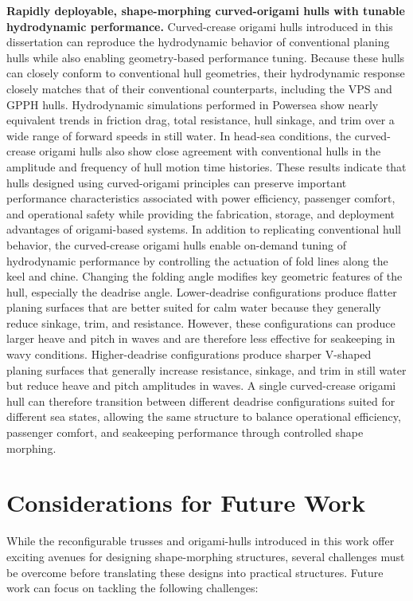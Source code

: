 \noindent{}\textbf{Rapidly deployable, shape-morphing curved-origami hulls with tunable hydrodynamic performance.} Curved-crease origami hulls introduced in this dissertation can reproduce the hydrodynamic behavior of conventional planing hulls while also enabling geometry-based performance tuning. Because these hulls can closely conform to conventional hull geometries, their hydrodynamic response closely matches that of their conventional counterparts, including the VPS and GPPH hulls. Hydrodynamic simulations performed in Powersea show nearly equivalent trends in friction drag, total resistance, hull sinkage, and trim over a wide range of forward speeds in still water. In head-sea conditions, the curved-crease origami hulls also show close agreement with conventional hulls in the amplitude and frequency of hull motion time histories. These results indicate that hulls designed using curved-origami principles can preserve important performance characteristics associated with power efficiency, passenger comfort, and operational safety while providing the fabrication, storage, and deployment advantages of origami-based systems. In addition to replicating conventional hull behavior, the curved-crease origami hulls enable on-demand tuning of hydrodynamic performance by controlling the actuation of fold lines along the keel and chine. Changing the folding angle modifies key geometric features of the hull, especially the deadrise angle. Lower-deadrise configurations produce flatter planing surfaces that are better suited for calm water because they generally reduce sinkage, trim, and resistance. However, these configurations can produce larger heave and pitch in waves and are therefore less effective for seakeeping in wavy conditions. Higher-deadrise configurations produce sharper V-shaped planing surfaces that generally increase resistance, sinkage, and trim in still water but reduce heave and pitch amplitudes in waves. A single curved-crease origami hull can therefore transition between different deadrise configurations suited for different sea states, allowing the same structure to balance operational efficiency, passenger comfort, and seakeeping performance through controlled shape morphing.

\section{Considerations for Future Work}\label{06-sec-future-work}
While the reconfigurable trusses and origami-hulls introduced in this work offer exciting avenues for designing shape-morphing structures, several challenges must be overcome before translating these designs into practical structures. Future work can focus on tackling the following challenges:

